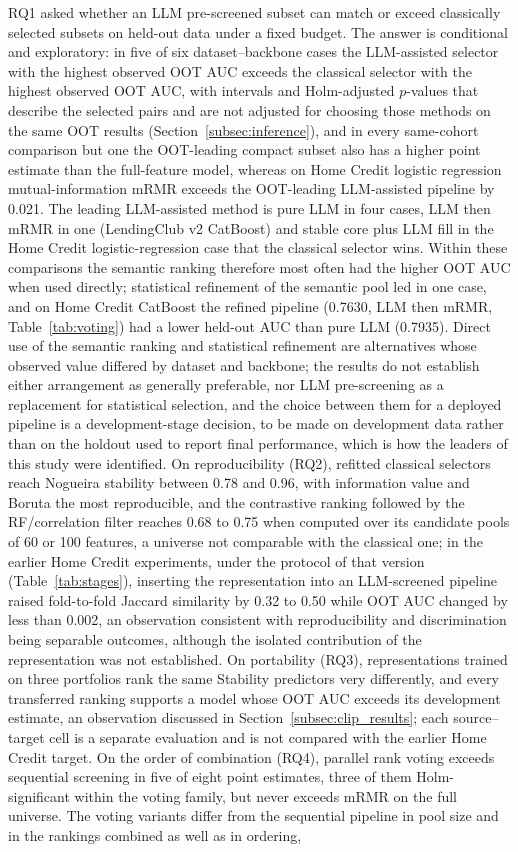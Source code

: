 \documentclass[final,5p,twocolumn]{elsarticle}
\begin{document}
RQ1 asked whether an LLM pre-screened subset can match or exceed classically selected subsets on held-out data under a fixed budget. The answer is conditional and exploratory: in five of six dataset--backbone cases the LLM-assisted selector with the highest observed OOT AUC exceeds the classical selector with the highest observed OOT AUC, with intervals and Holm-adjusted $p$-values that describe the selected pairs and are not adjusted for choosing those methods on the same OOT results (Section~\ref{subsec:inference}), and in every same-cohort comparison but one the OOT-leading compact subset also has a higher point estimate than the full-feature model, whereas on Home Credit logistic regression mutual-information mRMR exceeds the OOT-leading LLM-assisted pipeline by 0.021. The leading LLM-assisted method is pure LLM in four cases, LLM then mRMR in one (LendingClub v2 CatBoost) and stable core plus LLM fill in the Home Credit logistic-regression case that the classical selector wins. Within these comparisons the semantic ranking therefore most often had the higher OOT AUC when used directly; statistical refinement of the semantic pool led in one case, and on Home Credit CatBoost the refined pipeline (0.7630, LLM then mRMR, Table~\ref{tab:voting}) had a lower held-out AUC than pure LLM (0.7935). Direct use of the semantic ranking and statistical refinement are alternatives whose observed value differed by dataset and backbone; the results do not establish either arrangement as generally preferable, nor LLM pre-screening as a replacement for statistical selection, and the choice between them for a deployed pipeline is a development-stage decision, to be made on development data rather than on the holdout used to report final performance, which is how the leaders of this study were identified. On reproducibility (RQ2), refitted classical selectors reach Nogueira stability between 0.78 and 0.96, with information value and Boruta the most reproducible, and the contrastive ranking followed by the RF/correlation filter reaches 0.68 to 0.75 when computed over its candidate pools of 60 or 100 features, a universe not comparable with the classical one; in the earlier Home Credit experiments, under the protocol of that version (Table~\ref{tab:stages}), inserting the representation into an LLM-screened pipeline raised fold-to-fold Jaccard similarity by 0.32 to 0.50 while OOT AUC changed by less than 0.002, an observation consistent with reproducibility and discrimination being separable outcomes, although the isolated contribution of the representation was not established. On portability (RQ3), representations trained on three portfolios rank the same Stability predictors very differently, and every transferred ranking supports a model whose OOT AUC exceeds its development estimate, an observation discussed in Section~\ref{subsec:clip_results}; each source--target cell is a separate evaluation and is not compared with the earlier Home Credit target. On the order of combination (RQ4), parallel rank voting exceeds sequential screening in five of eight point estimates, three of them Holm-significant within the voting family, but never exceeds mRMR on the full universe. The voting variants differ from the sequential pipeline in pool size and in the rankings combined as well as in ordering, 
\end{document}
